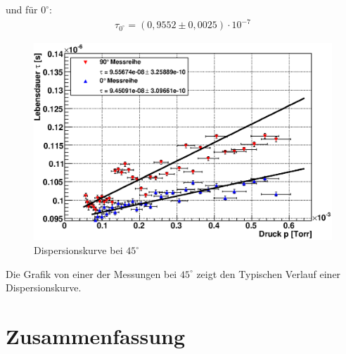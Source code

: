 \documentclass[12pt]{article}
\begin{document}
und für $0^\circ$:
\begin{align}
 \tau_{0^\circ} = (0,9552 \pm 0,0025) \cdot 10^{-7}
\end{align}


\begin{figure}[H]  
\centering
\includegraphics[width=0.9\linewidth]{pictures/lebensdauer_druck.eps}
\caption{Dispersionskurve bei $45^\circ$}
\end{figure}

Die Grafik von einer der Messungen bei $45^\circ$ zeigt den Typischen Verlauf einer Dispersionskurve.






\section{Zusammenfassung}
\end{document}
